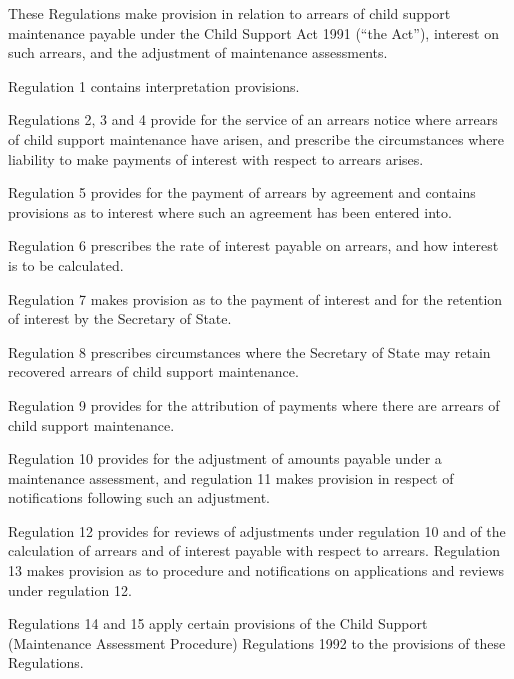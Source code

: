 \documentclass[12pt,a4paper]{article}
\begin{document}
 These Regulations make provision in relation to arrears of child support maintenance payable under the Child Support Act 1991 (“the Act”), interest on such arrears, and the adjustment of maintenance assessments.

  Regulation 1 contains interpretation provisions.

  Regulations 2, 3 and 4 provide for the service of an arrears notice where arrears of child support maintenance have arisen, and prescribe the circumstances where liability to make payments of interest with respect to arrears arises.

  Regulation 5 provides for the payment of arrears by agreement and contains provisions as to interest where such an agreement has been entered into.

  Regulation 6 prescribes the rate of interest payable on arrears, and how interest is to be calculated.

  Regulation 7 makes provision as to the payment of interest and for the retention of interest by the Secretary of State.

  Regulation 8 prescribes circumstances where the Secretary of State may retain recovered arrears of child support maintenance.

  Regulation 9 provides for the attribution of payments where there are arrears of child support maintenance.

  Regulation 10 provides for the adjustment of amounts payable under a maintenance assessment, and regulation 11 makes provision in respect of notifications following such an adjustment.

  Regulation 12 provides for reviews of adjustments under regulation 10 and of the calculation of arrears and of interest payable with respect to arrears. Regulation 13 makes provision as to procedure and notifications on applications and reviews under regulation 12.

  Regulations 14 and 15 apply certain provisions of the Child Support (Maintenance Assessment Procedure) Regulations 1992 to the provisions of these Regulations.
\end{document}
